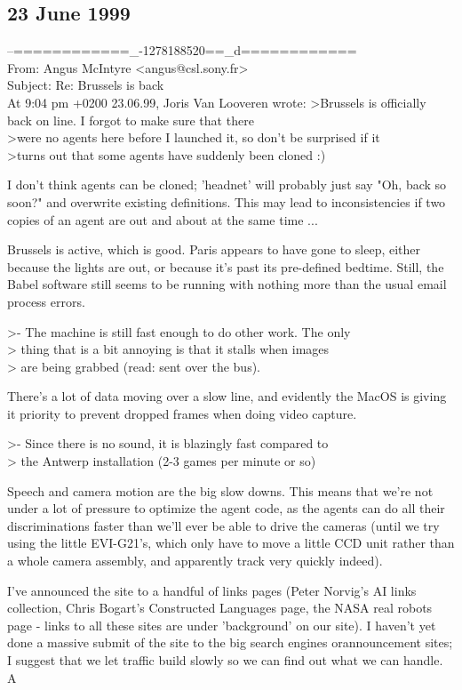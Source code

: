 \subsection*{23 June 1999}
\begin{mail}
--============\_-1278188520==\_d============\\
From: Angus McIntyre <angus@csl.sony.fr>\\
Subject: Re: Brussels is back\\

At 9:04 pm +0200 23.06.99, Joris Van Looveren wrote:
>Brussels is officially back on line. I forgot to make sure that there
\\>were no agents here before I launched it, so don't be surprised if it
\\>turns out that some agents have suddenly been cloned :)

I don't think agents can be cloned; 'headnet' will probably just 
say "Oh, back so soon?" and overwrite existing definitions. This 
may lead to inconsistencies if two copies of an agent are out 
and about at the same time ...

Brussels is active, which is good. Paris appears to have gone 
to sleep, either because the lights are out, or because it's 
past its pre-defined bedtime. Still, the Babel software still 
seems to be running with nothing more than the usual email process errors.

>- The machine is still fast enough to do other work. The only
\\>  thing that is a bit annoying is that it stalls when images
\\>  are being grabbed (read: sent over the bus).

There's a lot of data moving over a slow line, and evidently 
the MacOS is giving it priority to prevent dropped frames 
when doing video capture.

>- Since there is no sound, it is blazingly fast compared to
\\>  the Antwerp installation (2-3 games per minute or so)

Speech and camera motion are the big slow downs. This means that 
we're not under a lot of pressure to optimize the agent code, as 
the agents can do all their discriminations faster than we'll 
ever be able to drive the cameras (until we try using the little 
EVI-G21's, which only have to move a little CCD unit rather than 
a whole camera assembly, and apparently track very quickly indeed).

I've announced the site to a handful of links pages (Peter Norvig's 
AI links collection, Chris Bogart's Constructed Languages page, the 
NASA real robots page - links to all these sites are under 
'background' on our site). I haven't yet done a massive submit of 
the site to the big search engines or\clearpage announcement sites; I suggest 
that we let traffic build slowly so we can find out what we can handle.
	A
\end{mail}


